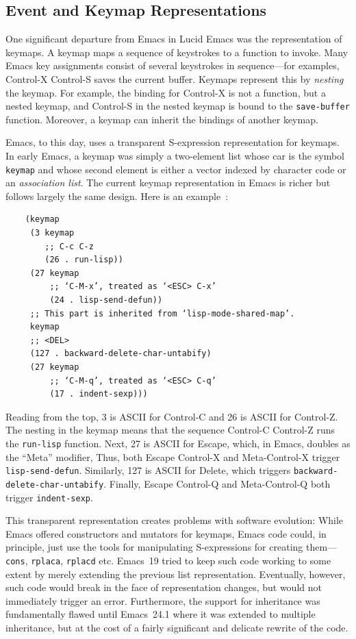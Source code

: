 \documentclass[format=acmsmall,screen]{acmart}
\begin{document}
\subsection{Event and Keymap Representations}
\label{sec:keymaps}

One significant departure from Emacs in Lucid Emacs was the
representation of keymaps.  A keymap maps a sequence of keystrokes to
a function to invoke.  Many Emacs key assignments consist of several
keystrokes in sequence---for examples, Control-X Control-S saves the
current buffer.  Keymaps represent this by \emph{nesting} the keymap.
For example, the binding for Control-X is not a function, but a nested
keymap, and Control-S in the nested keymap is bound to the
\texttt{save-buffer} function.  Moreover, a keymap can inherit the
bindings of another keymap.

Emacs, to this day, uses a transparent
S-expression representation for keymaps.
In early Emacs, a keymap was
simply a two-element list whose car is the symbol \texttt{keymap} and
whose second element is either a vector indexed by character code or an
\emph{association list}.
The current keymap representation in Emacs is richer but follows
largely the same design.  Here is an example~\cite{ELispManual2018}:
\begin{verbatim}
    (keymap
     (3 keymap
        ;; C-c C-z
        (26 . run-lisp))
     (27 keymap
         ;; ‘C-M-x’, treated as ‘<ESC> C-x’
         (24 . lisp-send-defun))
     ;; This part is inherited from ‘lisp-mode-shared-map’.
     keymap
     ;; <DEL>
     (127 . backward-delete-char-untabify)
     (27 keymap
         ;; ‘C-M-q’, treated as ‘<ESC> C-q’
         (17 . indent-sexp)))
\end{verbatim}
Reading from the top, 3 is ASCII for Control-C and 26 is ASCII for
Control-Z.  The nesting in the keymap means that the sequence
Control-C Control-Z runs the \texttt{run-lisp} function.  Next, 27 is
ASCII for Escape, which, in Emacs, doubles as the ``Meta'' modifier,
Thus, both Escape Control-X and Meta-Control-X trigger
\texttt{lisp-send-defun}.  Similarly, 127 is ASCII for Delete, which
triggers \texttt{backward-delete-char-untabify}.  Finally, Escape
Control-Q and Meta-Control-Q both trigger \texttt{indent-sexp}.

This transparent representation creates problems with software evolution:
While Emacs offered
constructors and mutators for keymaps, Emacs code could, in principle,
just use the tools for manipulating S-expressions for creating
them---\texttt{cons}, \texttt{rplaca}, \texttt{rplacd} etc.
Emacs~19 tried to keep such code working to some extent by merely
extending the previous list representation.
Eventually, however, such code would break in the face of representation
changes, but would not immediately trigger an error.  Furthermore, the
support for inheritance was fundamentally flawed until Emacs~24.1 where it
was extended to multiple inheritance, but at the cost of a fairly significant
and delicate rewrite of the code.
\end{document}
